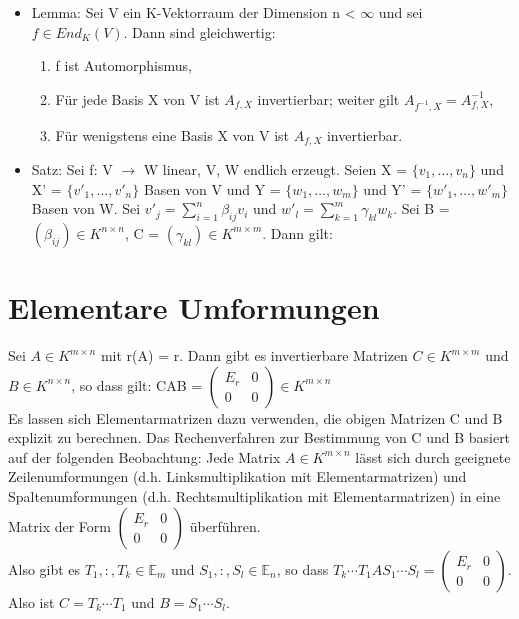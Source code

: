 \begin{itemize}
\begin{compactenum}
\end{compactenum}
\item Lemma: Sei V ein K-Vektorraum der Dimension n < $\infty$ und sei $f \in End_K (V)$. Dann sind gleichwertig:
\begin{enumerate}
\item f ist Automorphismus,
\item Für jede Basis X von V ist $A_{f,X}$ invertierbar; weiter gilt $A_{f^{-1},X} = A^{-1}_{f,X}$,
\item Für wenigstens eine Basis X von V ist $A_{f,X}$ invertierbar.
\end{enumerate}
\item Satz: Sei f: V $\to$ W linear, V, W endlich erzeugt. Seien X = $\{v_1, …, v_n\}$ und X' = $\{v'_1, …, v'_n\}$ Basen von V und Y = $\{w_1, …, w_m\}$ und Y' = $\{w'_1, …, w'_m\}$ Basen von W. Sei $v'_j = \sum\nolimits_{i=1}^{n} \beta_{ij} v_i$ und $w'_l = \sum\nolimits_{k=1}^{m} \gamma_{kl} w_k$. Sei B = $(\beta_{ij}) \in K^{n \times n}$, C = $(\gamma_{kl}) \in K^{m \times m}$. Dann gilt:
\end{itemize}

\section{Elementare Umformungen}
Sei $A \in K^{m \times n}$ mit r(A) = r. Dann gibt es invertierbare Matrizen $C \in K^{m \times m}$ und $B \in K^{n \times n}$, so dass gilt: CAB = $\begin{pmatrix} E_r & 0 \\ 0 & 0 \end{pmatrix} \in K^{m \times n}$\\
Es lassen sich Elementarmatrizen dazu verwenden, die obigen Matrizen C und B explizit zu berechnen. Das Rechenverfahren zur Bestimmung von C und B basiert auf der folgenden Beobachtung: Jede Matrix $A \in K^{m \times n}$ lässt sich durch geeignete Zeilenumformungen (d.h. Linksmultiplikation mit Elementarmatrizen) und Spaltenumformungen (d.h. Rechtsmultiplikation mit Elementarmatrizen) in eine Matrix der Form $\begin{pmatrix} E_r & 0 \\ 0 & 0 \end{pmatrix}$ überführen.\\
Also gibt es $T_1, :, T_k \in \mathbb{E}_m$ und $S_1, :, S_l \in \mathbb{E}_n$, so dass $T_k \cdots T_1AS_1 \cdots S_l = \begin{pmatrix} E_r & 0 \\ 0 & 0 \end{pmatrix}$.\\
Also ist $C = T_k \cdots T_1$ und $B = S_1 \cdots S_l$.\\ 

